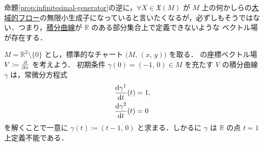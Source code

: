 \documentclass[TQFT_main]{subfiles}
\begin{document}
命題\ref{prop:infinitesimal-generator}の逆に，$\forall X \in \mathfrak{X}(M)$ が $M$ 上の何かしらの\hyperref[def:global-flow]{大域的フロー}の無限小生成子になっていると言いたくなるが，必ずしもそうではない．つまり，\hyperref[def:integral-curve]{積分曲線}が $\mathbb{R}$ のある部分集合上で定義できないような \cinfty ベクトル場が存在する．

\begin{myexample}[label=ex:local-flow]{}
    $M = \mathbb{R}^2 \setminus \{0\}$ とし，標準的なチャート $\bigl(M,\, (x,\, y)\bigr)$ を取る．
    の座標ベクトル場 $V \coloneqq \pdv{}{x}$ を考えよう．
    初期条件 $\gamma (0) = (-1,\, 0) \in M$ を充たす $V$ の積分曲線 $\gamma$ は，常微分方程式
    \begin{align}
        \dv{\gamma^1}{t}()(t) &= 1, \\
        \dv{\gamma^2}{t}()(t)&= 0
    \end{align}
    を解くことで一意に $\gamma(t) \coloneqq (t-1,\, 0)$ と求まる．しかるに $\gamma$ は $\mathbb{R}$ の点 $t = 1$ 上定義不能である．
\end{myexample}
\end{document}
